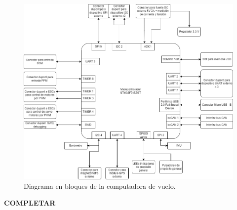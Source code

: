 \begin{figure}[H]
    \centering
    \includegraphics[width=\textwidth]{img/diagrama_en_bloques_computadora_de_vuelo.png}
    \caption{Diagrama en bloques de la computadora de vuelo.}
    \label{fig:diagrama_en_bloques_computadora_de_vuelo}
\end{figure}

\textbf{{\color{red} COMPLETAR}}